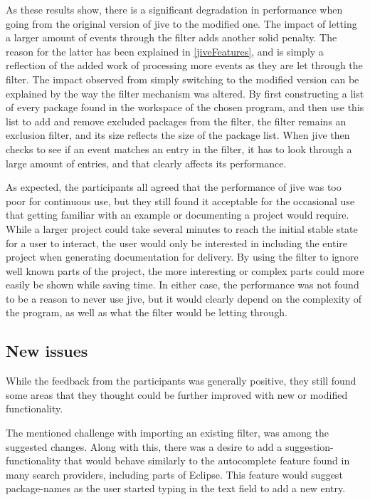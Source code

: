 As these results show, there is a significant degradation in performance when going from the original version of \gls{jive} to the modified one.
The impact of letting a larger amount of events through the filter adds another solid penalty.
The reason for the latter has been explained in \cref{jiveFeatures}, and is simply a reflection of the added work of processing more events as they are let through the filter.
The impact observed from simply switching to the modified version can be explained by the way the filter mechanism was altered.
By first constructing a list of every package found in the workspace of the chosen program, and then use this list to add and remove excluded packages from the filter, the filter remains an exclusion filter, and its size reflects the size of the package list.
When \gls{jive} then checks to see if an event matches an entry in the filter, it has to look through a large amount of entries, and that clearly affects its performance.

As expected, the participants all agreed that the performance of \gls{jive} was too poor for continuous use, but they still found it acceptable for the occasional use that getting familiar with an example or documenting a project would require.
While a larger project could take several minutes to reach the initial stable state for a user to interact, the user would only be interested in including the entire project when generating documentation for delivery.
By using the filter to ignore well known parts of the project, the more interesting or complex parts could more easily be shown while saving time.
In either case, the performance was not found to be a reason to never use \gls{jive}, but it would clearly depend on the complexity of the program, as well as what the filter would be letting through.

\subsection{New issues}\label{jiveEvalIssues}
While the feedback from the participants was generally positive, they still found some areas that they thought could be further improved with new or modified functionality.

The mentioned challenge with importing an existing filter, was among the suggested changes.
Along with this, there was a desire to add a suggestion-functionality that would behave similarly to the autocomplete feature found in many search providers, including parts of Eclipse.
This feature would suggest package-names as the user started typing in the text field to add a new entry.

